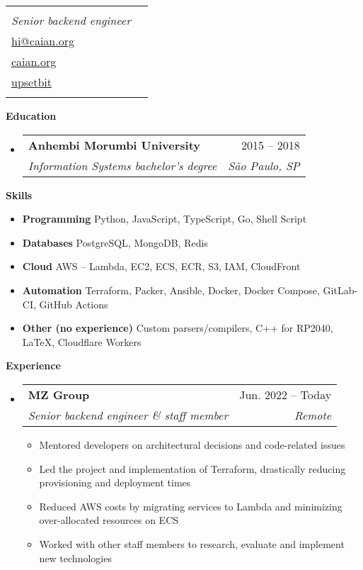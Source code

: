 \documentclass[letterpaper,12pt]{article}[leftmargin=*]
\makeatletter
\def \fullname {Caian Ertl}
\def \subtitle {Senior backend engineer}
\def \emailicon {\faEnvelope}
\def \emaillink {mailto:hi@caian.org}
\def \emailtext {hi@caian.org}
\def \phoneicon {\faPhone}
\def \phonetext {+55 (11) 98161-5593}
\def \githubicon {\faGithub}
\def \githublink {https://github.com/upsetbit}
\def \githubtext {upsetbit}
\def \websiteicon {\faGlobe}
\def \websitelink {https://caian.org}
\def \websitetext {caian.org}
\def \headertype {\singlecol} %
\def \entryspacing {-0pt}
\def \phone {\phoneicon \hspace{3pt}{ \phonetext}}
\def \email {\emailicon \hspace{3pt}\href{\emaillink}{\emailtext}}
\def \github {\githubicon \hspace{3pt}\href{\githublink}{\githubtext}}
\def \website {\websiteicon \hspace{3pt}\href{\websitelink}{\websitetext}}
\renewcommand{\section}[2]{\vspace{5pt}
  \colorbox{secondary}{\color{white}\raggedbottom\normalsize\textbf{{#1}{\hspace{7pt}#2}}}
}
\newcommand{\resumeEntryStart}{\begin{itemize}[leftmargin=2.5mm]}
\newcommand{\resumeEntryEnd}{\end{itemize}\vspace{\entryspacing}}
\newcommand{\resumeItemListStart}{\begin{itemize}[leftmargin=4.5mm]}
\newcommand{\resumeItemListEnd}{\end{itemize}}
\newcommand{\resumeItem}[1]{
  \item\small{
    {#1 \vspace{-2pt}}
  }
}
\newcommand{\resumeEntryTSDL}[4]{
  \vspace{-1pt}\item[]
    \begin{tabularx}{0.97\textwidth}{X@{\hspace{60pt}}r}
      \textbf{\color{primary}#1} & {\firabook\color{accent}\small#2} \\
      \textit{\color{accent}\small#3} & \textit{\color{accent}\small#4} \\
    \end{tabularx}\vspace{-6pt}
}
\newcommand{\resumeEntryS}[2]{
  \item[]\small{
    \textbf{\color{primary}#1 }{ #2 \vspace{-6pt}}
  }
}
\newcommand{\doublecol}[5]{
  \begin{tabularx}{\textwidth}{Xr}
    {
      \begin{tabular}[c]{l}
        \fontsize{35}{45}\selectfont{\color{primary}{{\textbf{\fullname}}}} \\
        {\textit{\subtitle}} %
      \end{tabular}
    } & {
      \begin{tabular}[c]{l@{\hspace{1.5em}}l}
        {\small#3} & {\small#1} \\
        {\small#4} & {\small#2} \\
        {\small#5}
      \end{tabular}
    }
  \end{tabularx}
}
\newcommand{\singlecol}[5]{
  \begin{tabularx}{\textwidth}{Xr}
    {
      \begin{tabular}[b]{l}
        \fontsize{35}{45}\selectfont{\color{primary}{{\textbf{\fullname}}}} \\
        {\textit{\subtitle}} %
      \end{tabular}
    } & {
      \begin{tabular}[c]{l}
        {\small#1} \\
        {\small#2} \\
        {\small#3} \\
        {\small#4} \\
        {\small#5}
      \end{tabular}
    }
  \end{tabularx}
}
\makeatother
\begin{document}


\headertype{\phone}{\email}{\website}{\github}{} %
\vspace{-10pt} %

\section{\faGraduationCap}{Education }

  \resumeEntryStart
    \resumeEntryTSDL
      {Anhembi Morumbi University}{2015 -- 2018}
      {Information Systems bachelor’s degree}{São Paulo, SP}
  \resumeEntryEnd

\section{\faGears}{Skills }
 \resumeEntryStart
  \resumeEntryS{Programming } {Python, JavaScript, TypeScript, Go, Shell Script}
  \resumeEntryS{Databases } {PostgreSQL, MongoDB, Redis}
  \resumeEntryS{Cloud } {AWS -- Lambda, EC2, ECS, ECR, S3, IAM, CloudFront}
  \resumeEntryS{Automation } {Terraform, Packer, Ansible, Docker, Docker Compose, GitLab-CI, GitHub Actions}
  \resumeEntryS{Other (no experience) } {Custom parsers/compilers, C++ for RP2040, \LaTeX, Cloudflare Workers}
 \resumeEntryEnd

\section{\faPieChart}{Experience }

  \resumeEntryStart
    \resumeEntryTSDL
      {MZ Group}{Jun. 2022 -- Today}
      {Senior backend engineer \& staff member}{Remote}
    \resumeItemListStart
      \resumeItem {Mentored developers on architectural decisions and code-related issues}
      \resumeItem {Led the project and implementation of Terraform, drastically reducing provisioning and deployment times}
      \resumeItem {Reduced AWS costs by migrating services to Lambda and minimizing over-allocated resources on ECS}
      \resumeItem {Worked with other staff members to research, evaluate and implement new technologies}
    \resumeItemListEnd
  \resumeEntryEnd
\end{document}
